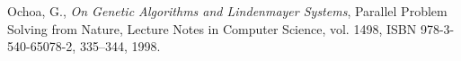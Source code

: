 \documentclass{llncs}
\begin{document}
\begin{thebibliography}{99}

 Ochoa, G., \textit{On Genetic Algorithms and Lindenmayer Systems}, Parallel Problem Solving from Nature, Lecture Notes in Computer Science, vol. 1498, ISBN 978-3-540-65078-2, 335--344, 1998.

\end{thebibliography}
\end{document}
